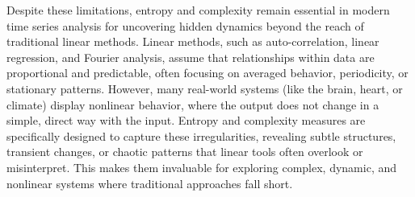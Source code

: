Despite these limitations, entropy and complexity remain essential in modern time series analysis for uncovering hidden dynamics beyond the reach of traditional linear methods. Linear methods, such as auto-correlation, linear regression, and Fourier analysis, assume that relationships within data are proportional and predictable, often focusing on averaged behavior, periodicity, or stationary patterns. However, many real-world systems (like the brain, heart, or climate) display nonlinear behavior, where the output does not change in a simple, direct way with the input. Entropy and complexity measures are specifically designed to capture these irregularities, revealing subtle structures, transient changes, or chaotic patterns that linear tools often overlook or misinterpret. This makes them invaluable for exploring complex, dynamic, and nonlinear systems where traditional approaches fall short.




